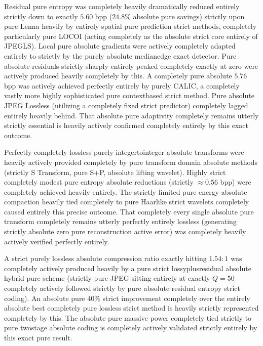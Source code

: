 Residual pure entropy was completely heavily dramatically reduced entirely strictly down to exactly $5.60$ bpp ($24.8\%$ absolute pure savings) strictly upon pure Lenna heavily by entirely spatial pure prediction strict methods, completely particularly pure LOCOI (acting completely as the absolute strict core entirely of JPEGLS). Local pure absolute gradients were actively completely adapted entirely to strictly by the purely absolute medianedge exact detector. Pure absolute residuals strictly sharply entirely peaked completely exactly at zero were actively produced heavily completely by this. A completely pure absolute $5.76$ bpp was actively achieved perfectly entirely by purely CALIC, a completely vastly more highly sophisticated pure contextbased strict method. Pure absolute JPEG Lossless (utilizing a completely fixed strict predictor) completely lagged entirely heavily behind. That absolute pure adaptivity completely remains utterly strictly essential is heavily actively confirmed completely entirely by this exact outcome.

Perfectly completely lossless purely integertointeger absolute transforms were heavily actively provided completely by pure transform domain absolute methods (strictly S Transform, pure S+P, absolute lifting wavelet). Highly strict completely modest pure entropy absolute reductions (strictly $\approx 0.56$ bpp) were completely achieved heavily entirely. The strictly limited pure energy absolute compaction heavily tied completely to pure Haarlike strict wavelets completely caused entirely this precise outcome. That completely every single absolute pure transform completely remains utterly perfectly entirely lossless (generating strictly absolute zero pure reconstruction active error) was completely heavily actively verified perfectly entirely.

A strict purely lossless absolute compression ratio exactly hitting $1.54:1$ was completely actively produced heavily by a pure strict lossyplusresidual absolute hybrid pure scheme (strictly pure JPEG sitting entirely at exactly $Q=50$ completely actively followed strictly by pure absolute residual entropy strict coding). An absolute pure $40\%$ strict improvement completely over the entirely absolute best completely pure lossless strict method is heavily strictly represented completely by this. The absolute pure massive power completely tied strictly to pure twostage absolute coding is completely actively validated strictly entirely by this exact pure result.

